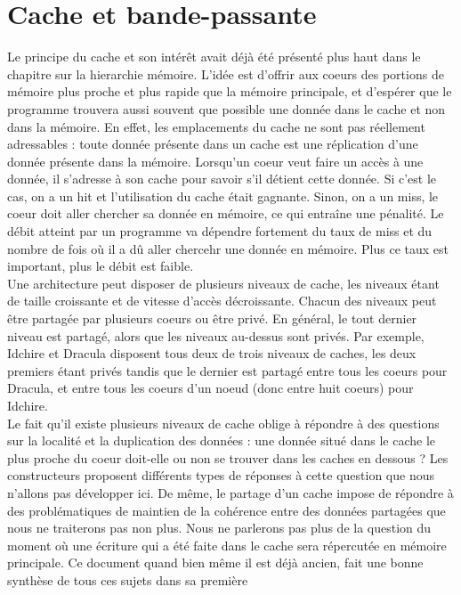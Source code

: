 \documentclass{report}
\begin{document}
\section{Cache et bande-passante}
Le principe du cache et son intérêt avait déjà été présenté plus haut dans le chapitre sur la 
hierarchie mémoire. L'idée est d'offrir aux coeurs des portions de mémoire plus proche et plus 
rapide que la mémoire principale, et d'espérer que le programme trouvera aussi souvent que possible
une donnée dans le cache et non dans la mémoire. En effet, les emplacements du cache ne sont pas
réellement adressables : toute donnée présente dans un cache est une réplication d'une donnée
présente dans la mémoire. Lorsqu'un coeur veut faire un accès à une donnée, il s'adresse à son 
cache pour savoir s'il détient cette donnée. Si c'est le cas, on a un hit et l'utilisation du
cache était gagnante. Sinon, on a un miss, le coeur doit aller chercher sa donnée en mémoire,
ce qui entraîne une pénalité. Le débit atteint par un programme va dépendre fortement du taux
de miss et du nombre de fois où il a dû aller chercehr une donnée en mémoire. Plus ce taux est
important, plus le débit est faible.
\\Une architecture peut disposer de plusieurs niveaux de cache, les niveaux étant de taille
croissante et de vitesse d'accès décroissante. Chacun des niveaux peut être partagée par plusieurs
coeurs ou être privé. En général, le tout dernier niveau est partagé, alors que les niveaux au-dessus
sont privés. Par exemple, Idchire et Dracula disposent tous deux de trois niveaux de caches, les deux
premiers étant privés tandis que le dernier est partagé entre tous les coeurs pour Dracula, et entre
tous les coeurs d'un noeud (donc entre huit coeurs) pour Idchire.
\\Le fait qu'il existe plusieurs niveaux de cache oblige à répondre à des questions sur la localité
et la duplication des données : une donnée situé dans le cache le plus proche du coeur doit-elle ou
non se trouver dans les caches en dessous ? Les constructeurs proposent différents types de réponses
à cette question que nous n'allons pas développer ici. De même, le partage d'un cache impose de 
répondre à des problématiques de maintien de la cohérence entre des données partagées que nous ne
traiterons pas non plus. Nous ne parlerons pas plus de la question du moment où une écriture
qui a été faite dans le cache sera répercutée en mémoire principale. Ce document \cite{cachebus} 
quand bien même il est déjà ancien, fait une bonne synthèse de tous ces sujets dans sa première
\end{document}
